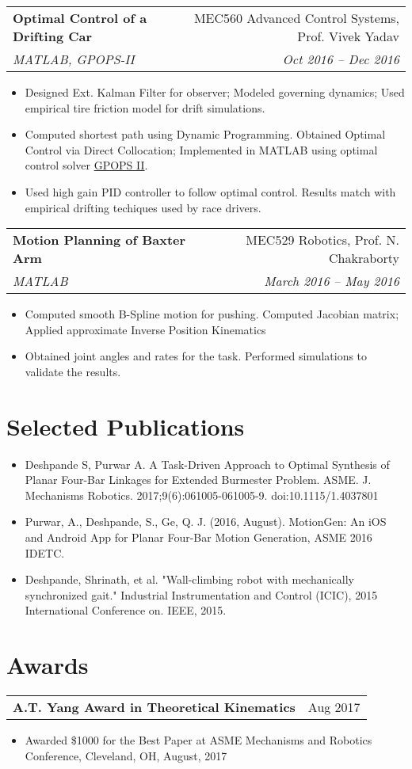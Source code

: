 \documentclass[letterpaper,10pt]{article}
\makeatletter
\newcommand{\resumeHeading}[4]{
  \vspace{-1pt}
    \begin{tabular*}{0.97\textwidth}{l@{\extracolsep{\fill}}r}
      \textbf{#1} & #2 \vspace{-2pt}\\ \vspace{1pt}
      \textit{\small#3} & \textit{\small #4} \\
    \end{tabular*}
}
\newcommand{\resumeSubheadingWithDate}[2]{
    \begin{tabular*}{0.97\textwidth}{l@{\extracolsep{\fill}}r}
      \small\textbf{#1} & \small #2 \\
    \end{tabular*}
    \vspace{+2pt}
}
\newcommand{\resumeSection}[1]{
\vspace{-12pt}
\section{\textbf{#1}}
}
\newcommand{\resumeItemListStart}{
\vspace{-7pt}
\begin{itemize}[leftmargin=14pt]
}
\newcommand{\resumeItemListEnd}{
\vspace{+7pt}
\end{itemize}
}
\newcommand{\resumeItem}[1]{
  \item\small{
      {#1 \vspace{-7pt}
      }
  }
}
\makeatother
\begin{document}
    \resumeHeading{Optimal Control of a Drifting Car}{MEC560 Advanced Control Systems, Prof. Vivek Yadav}{MATLAB, GPOPS-II}{Oct 2016 -- Dec 2016}
    \resumeItemListStart
      \resumeItem{Designed Ext. Kalman Filter for observer; Modeled governing dynamics; Used empirical tire friction model for drift simulations.}
      \resumeItem{Computed shortest path using Dynamic Programming. Obtained Optimal Control via Direct Collocation; Implemented in MATLAB using optimal control solver \href{http://www.gpops2.com/}{GPOPS II}.}
      \resumeItem{Used high gain PID controller to follow optimal control. Results match with empirical drifting techiques used by race drivers.}
    \resumeItemListEnd

    \resumeHeading{Motion Planning of Baxter Arm}{MEC529 Robotics, Prof. N. Chakraborty}{MATLAB}{March 2016 -- May 2016}
    \resumeItemListStart
      \resumeItem{Computed smooth B-Spline motion for pushing. Computed Jacobian matrix; Applied approximate Inverse Position Kinematics}
      \resumeItem{Obtained joint angles and rates for the task. Performed simulations to validate the results.}
    \resumeItemListEnd



\resumeSection{Selected Publications}
\vspace{+7pt}
    \resumeItemListStart
      \resumeItem{Deshpande S, Purwar A. A Task-Driven Approach to Optimal Synthesis of Planar Four-Bar Linkages for Extended Burmester Problem. ASME. J. Mechanisms Robotics. 2017;9(6):061005-061005-9. doi:10.1115/1.4037801}
      \resumeItem{Purwar, A., Deshpande, S., Ge, Q. J. (2016, August). MotionGen: An iOS and Android App for Planar Four-Bar Motion Generation, ASME 2016 IDETC.}
      \resumeItem{Deshpande, Shrinath, et al. "Wall-climbing robot with mechanically synchronized gait." Industrial Instrumentation and Control (ICIC), 2015 International Conference on. IEEE, 2015.}
    \resumeItemListEnd

\resumeSection{Awards}
    \resumeSubheadingWithDate{A.T. Yang Award in Theoretical Kinematics}{Aug 2017}
    \resumeItemListStart
      \resumeItem{Awarded \$1000 for the Best Paper at ASME Mechanisms and Robotics Conference, Cleveland, OH, August, 2017}
    \resumeItemListEnd
\end{document}
